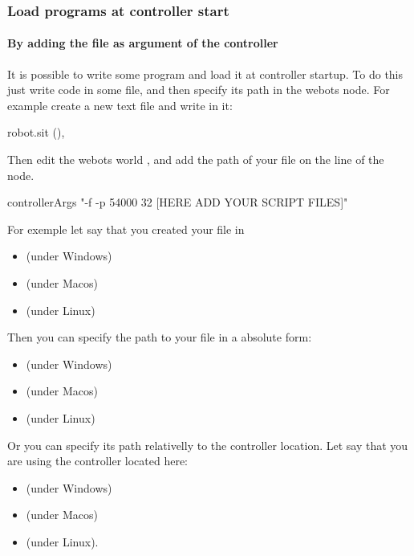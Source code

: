 \subsubsection{Load \urbi programs at controller start}

\paragraph{By adding the file as argument of the \urbi controller}

It is possible to write some \us program and load it at controller
startup.  To do this just write \us code in some file, and then
specify its path in the  webots node.  For
example create a new text file  and write in it:

\begin{urbifixme}
robot.sit (),
\end{urbifixme}

Then edit the webots world , and
add the path of your file  on the line of the
 node.


\begin{shell}
controllerArgs "-f -p 54000 32 [HERE ADD YOUR SCRIPT FILES]"
\end{shell}

For exemple let say that you created your file in
\begin{itemize}
\item {}
  (under Windows)
\item {}
  (under Macos)
\item {}
  (under Linux)
\end{itemize}

Then you can specify the path to your file in a absolute form:
\begin{itemize}
\item {}
  (under Windows)
\item {}
  (under Macos)
\item {}
  (under Linux)
\end{itemize}

Or you can specify its path relativelly to the \urbi controller
location.  Let say that you are using the \urbi controller located
here:
\begin{itemize}
\item {}
  (under Windows)
\item
  (under Macos)
\item {}
  (under Linux).
\end{itemize}

